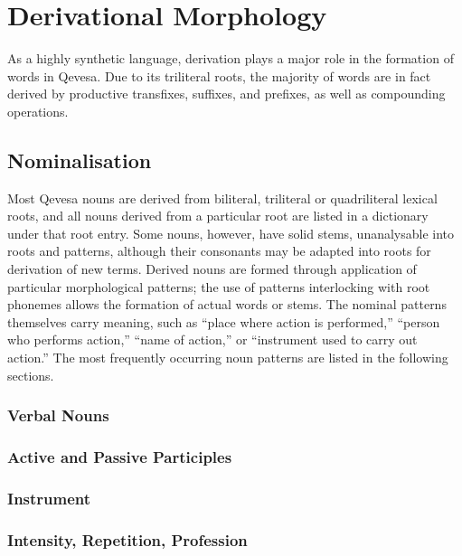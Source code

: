 \documentclass[grammar]{subfiles}
\begin{document}
\chapter{Derivational Morphology}
\label{ch:lexical-morphology}

As a highly synthetic language, derivation plays a major role in the formation of words in Qevesa.  Due to its triliteral roots, the majority of words are in fact derived by productive transfixes, suffixes, and prefixes, as well as compounding operations.

\section{Nominalisation}
\label{sec:dev_nominalisation}

Most Qevesa nouns are derived from biliteral, triliteral or quadriliteral lexical roots, and all nouns derived from a particular root are listed in a dictionary under that root entry.  Some nouns, however, have solid stems, unanalysable into roots and patterns, although their consonants may be adapted into roots for derivation of new terms.  Derived nouns are formed through application of particular morphological patterns; the use of patterns interlocking with root phonemes allows the formation of actual words or stems.  The nominal patterns themselves carry meaning, such as “place where action is performed,” “person who performs action,” “name of action,” or “instrument used to carry out action.” The most frequently occurring noun patterns are listed in the following sections.

\subsection{Verbal Nouns}
\label{ssec:dev_verbal_nouns}

\tbw

\subsection{Active and Passive Participles}
\label{ssec:dev_active_passive_participles}

\tbw

\subsection{Instrument}
\label{ssec:dev_nouns_instrument}

\tbw

\subsection{Intensity, Repetition, Profession}
\label{ssec:dev_nouns_intensity_repetition_profession}
\end{document}
